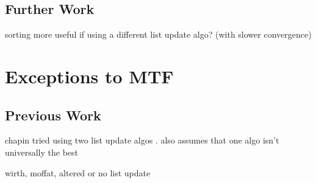 \documentclass[a4paper]{scrreprt}
\begin{document}
\section{Further Work}

sorting more useful if using a different list update algo? (with slower
convergence)

\chapter{Exceptions to MTF}

\section{Previous Work}

chapin tried using two list update algos
\cite{chapin2000switching,chapin2001diss}. also assumes that one algo isn't
universally the best

wirth, moffat, altered or no list update \cite{wirth2001ranks}



\end{document}
